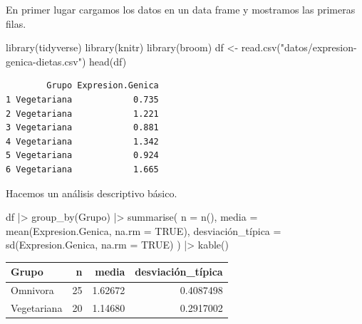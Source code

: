 \documentclass[
  spanish,
  a4paper,
]{scrreport}
\newenvironment{Shaded}{\begin{snugshade}}{\end{snugshade}}
\newcommand{\AttributeTok}[1]{\textcolor[rgb]{0.40,0.45,0.13}{#1}}
\newcommand{\ConstantTok}[1]{\textcolor[rgb]{0.56,0.35,0.01}{#1}}
\newcommand{\FunctionTok}[1]{\textcolor[rgb]{0.28,0.35,0.67}{#1}}
\newcommand{\NormalTok}[1]{\textcolor[rgb]{0.00,0.23,0.31}{#1}}
\newcommand{\OtherTok}[1]{\textcolor[rgb]{0.00,0.23,0.31}{#1}}
\newcommand{\SpecialCharTok}[1]{\textcolor[rgb]{0.37,0.37,0.37}{#1}}
\newcommand{\StringTok}[1]{\textcolor[rgb]{0.13,0.47,0.30}{#1}}
\newcounter{none} %
\theoremstyle{definition}
\theoremstyle{remark}
\begin{document}
\begin{tcolorbox}[enhanced jigsaw, arc=.35mm, bottomrule=.15mm, bottomtitle=1mm, breakable, colback=white, colbacktitle=quarto-callout-tip-color!10!white, colframe=quarto-callout-tip-color-frame, coltitle=black, left=2mm, leftrule=.75mm, opacityback=0, opacitybacktitle=0.6, rightrule=.15mm, title=\textcolor{quarto-callout-tip-color}{\faLightbulb}\hspace{0.5em}{Solución}, titlerule=0mm, toprule=.15mm, toptitle=1mm]

En primer lugar cargamos los datos en un data frame y mostramos las
primeras filas.

\begin{Shaded}
\begin{Highlighting}[]
\FunctionTok{library}\NormalTok{(tidyverse)}
\FunctionTok{library}\NormalTok{(knitr)}
\FunctionTok{library}\NormalTok{(broom)}
\NormalTok{df }\OtherTok{\textless{}{-}} \FunctionTok{read.csv}\NormalTok{(}\StringTok{"datos/expresion{-}genica{-}dietas.csv"}\NormalTok{)}
\FunctionTok{head}\NormalTok{(df)}
\end{Highlighting}
\end{Shaded}

\begin{verbatim}
        Grupo Expresion.Genica
1 Vegetariana            0.735
2 Vegetariana            1.221
3 Vegetariana            0.881
4 Vegetariana            1.342
5 Vegetariana            0.924
6 Vegetariana            1.665
\end{verbatim}

Hacemos un análisis descriptivo básico.

\begin{Shaded}
\begin{Highlighting}[]
\NormalTok{df }\SpecialCharTok{|\textgreater{}} 
    \FunctionTok{group\_by}\NormalTok{(Grupo) }\SpecialCharTok{|\textgreater{}} 
    \FunctionTok{summarise}\NormalTok{(}
        \AttributeTok{n =} \FunctionTok{n}\NormalTok{(),}
        \AttributeTok{media =} \FunctionTok{mean}\NormalTok{(Expresion.Genica, }\AttributeTok{na.rm =} \ConstantTok{TRUE}\NormalTok{),}
\NormalTok{        desviación\_típica }\OtherTok{=} \FunctionTok{sd}\NormalTok{(Expresion.Genica, }\AttributeTok{na.rm =} \ConstantTok{TRUE}\NormalTok{)}
\NormalTok{    ) }\SpecialCharTok{|\textgreater{}} 
    \FunctionTok{kable}\NormalTok{()}
\end{Highlighting}
\end{Shaded}

{\def\LTcaptype{none} %
\begin{longtable}[]{@{}lrrr@{}}
\toprule\noalign{}
Grupo & n & media & desviación\_típica \\
\midrule\noalign{}
\endhead
\bottomrule\noalign{}
\endlastfoot
Omnivora & 25 & 1.62672 & 0.4087498 \\
Vegetariana & 20 & 1.14680 & 0.2917002 \\
\end{longtable}
}


\end{tcolorbox}
\end{document}

